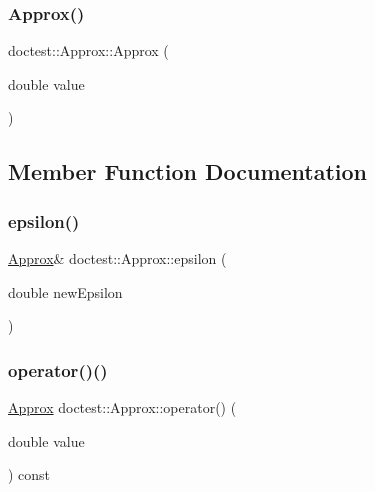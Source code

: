 \subsubsection{\texorpdfstring{Approx()}{Approx()}}
{\footnotesize\ttfamily doctest\+::\+Approx\+::\+Approx (\begin{DoxyParamCaption}\item[{double}]{value }\end{DoxyParamCaption})\hspace{0.3cm}{\ttfamily [explicit]}}



\subsection{Member Function Documentation}
\mbox{\label{classdoctest_1_1_approx_af8df6b0af00fd875e5b6a0c30b86f636}} 
\subsubsection{\texorpdfstring{epsilon()}{epsilon()}}
{\footnotesize\ttfamily \mbox{\hyperlink{classdoctest_1_1_approx}{Approx}}\& doctest\+::\+Approx\+::epsilon (\begin{DoxyParamCaption}\item[{double}]{new\+Epsilon }\end{DoxyParamCaption})}

\mbox{\label{classdoctest_1_1_approx_aae907c5ea1c4ac94e134db9e35da7dce}} 
\subsubsection{\texorpdfstring{operator()()}{operator()()}}
{\footnotesize\ttfamily \mbox{\hyperlink{classdoctest_1_1_approx}{Approx}} doctest\+::\+Approx\+::operator() (\begin{DoxyParamCaption}\item[{double}]{value }\end{DoxyParamCaption}) const}

\mbox{\label{classdoctest_1_1_approx_a62185fd4c09a63dab61bd893574d8473}} 
